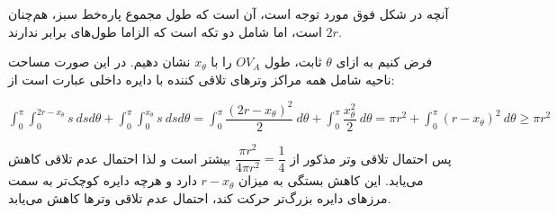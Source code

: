 \documentclass{scribe-cgenomics}
\begin{document}
\begin{حل}
آنچه در شکل فوق مورد توجه است، آن است که طول مجموع پاره‌خط سبز، هم‌چنان
$2r$
است، اما شامل دو تکه است که الزاما طول‌های برابر ندارند.

فرض کنیم به ازای
$\theta$
ثابت، طول
$OV_A$
را با
$x_{\theta}$
نشان دهیم. در این صورت مساحت ناحیه شامل همه مراکز وترهای تلاقی کننده با دایره داخلی عبارت است از:

\begin{center}
$
\int_{0}^{\pi} \int_{0}^{2r-x_{\theta}} s\ dsd\theta +
\int_{0}^{\pi} \int_{0}^{x_{\theta}} s\ dsd\theta 
= \int_{0}^{\pi} \dfrac{(2r-x_{\theta})^2}{2} \ d\theta +
\int_{0}^{\pi} \dfrac{x_{\theta}^2}{2}\ d\theta
= \pi r^2 + \int_{0}^{\pi} (r-x_{\theta})^2\ d\theta \geq \pi r^2
$
\end{center}

پس احتمال تلاقی وتر مذکور از
$\dfrac{\pi r^2}{4\pi r^2} = \dfrac{1}{4}$
بیشتر است و لذا احتمال عدم تلاقی کاهش می‌یابد. این کاهش بستگی به میزان
$r-x_{\theta}$
دارد و هرچه دایره کوچک‌تر به سمت مرزهای دایره بزرگ‌تر حرکت کند، احتمال عدم تلاقی وترها کاهش می‌یابد.


\end{حل}


\newpage
\begin{prob}
\end{prob}
\end{document}
